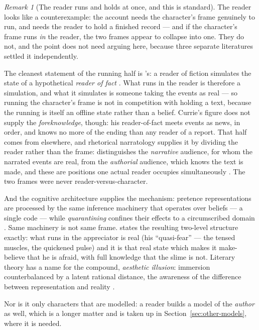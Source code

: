 \documentclass[11pt,a4paper]{article}
\theoremstyle{remark}\newtheorem{remark}[definition]{Remark}
\begin{document}
\begin{remark}[The reader runs and holds at once, and this is standard]\label{rem:reader}
The reader looks like a counterexample: the account needs the character's frame genuinely to run,
and needs the reader to hold a finished record --- and if the character's frame runs \emph{in}
the reader, the two frames appear to collapse into one. They do not, and the point does not need
arguing here, because three separate literatures settled it independently.

The cleanest statement of the running half is \citeauthor{currie1997}'s: a reader of fiction
simulates the state of a hypothetical \emph{reader of fact} \citep{currie1997,currie2002}. What
runs in the reader is therefore a simulation, and what it simulates is someone taking the events
as real --- so running the character's frame is not in competition with holding a text, because
the running is itself an offline state rather than a belief. Currie's figure does not supply the
\emph{foreknowledge}, though: his reader-of-fact meets events as news, in order, and knows no more
of the ending than any reader of a report. That half comes from elsewhere, and rhetorical
narratology supplies it by dividing the reader rather than the frame: \citet{rabinowitz1977} distinguishes the \emph{narrative} audience, for
whom the narrated events are real, from the \emph{authorial} audience, which knows the text is
made, and these are positions one actual reader occupies simultaneously
\citep{polvinen2019}. The two frames were never reader-versus-character.

And the cognitive
architecture supplies the mechanism: pretence representations are processed by the same inference
machinery that operates over beliefs --- a single code \citep{nichols2000} --- while
\emph{quarantining} confines their effects to a circumscribed domain \citep{gendler2003}. Same
machinery is not same frame. \citet{walton1978} states the resulting two-level structure exactly:
what runs in the appreciator is real (his ``quasi-fear'' --- the tensed muscles, the quickened
pulse) and it is that real state which makes it make-believe that he is afraid, with full
knowledge that the slime is not. Literary theory has a name for the compound, \emph{aesthetic
illusion}: immersion counterbalanced by a latent rational distance, the awareness of the
difference between representation and reality \citep{wolf2014}.

Nor is it only characters that are modelled: a reader builds a model of the \emph{author} as
well, which is a longer matter and is taken up in Section~\ref{sec:other-models}, where it is
needed.


\end{remark}
\end{document}
